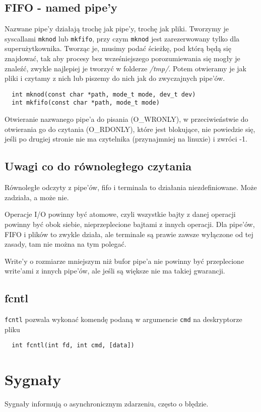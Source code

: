 \subsection{FIFO - named pipe'y}
Nazwane pipe'y działają trochę jak pipe'y, trochę jak pliki. Tworzymy je syscallami \texttt{mknod} lub \texttt{mkfifo}, przy czym \texttt{mknod} jest zarezerwowany tylko dla superużytkownika. Tworząc je, musimy podać ścieżkę, pod którą będą się znajdować, tak aby procesy bez wcześniejszego porozumiewania się mogły je znaleźć, zwykle najlepiej je tworzyć w folderze \textit{/tmp/}. Potem otwieramy je jak pliki i czytamy z nich lub piszemy do nich jak do zwyczajnych pipe'ów.
\begin{verbatim}
  int mknod(const char *path, mode_t mode, dev_t dev)
  int mkfifo(const char *path, mode_t mode)
\end{verbatim}
Otwieranie nazwanego pipe'a do pisania (O\_WRONLY), w przeciwieństwie do otwierania go do czytania (O\_RDONLY), które jest blokujące, nie powiedzie się, jeśli po drugiej stronie nie ma czytelnika (przynajmniej na linuxie) i zwróci -1.
\subsection{Uwagi co do równoległego czytania}
Równoległe odczyty z pipe'ów, fifo i terminala to działania niezdefiniowane. Może zadziała, a może nie.

Operacje I/O powinny być atomowe, czyli wszystkie bajty z danej operacji powinny być obok siebie, nieprzeplecione bajtami z innych operacji. Dla pipe'ów, FIFO i plików to zwykle działa, ale terminale są prawie zawsze wyłączone od tej zasady, tam nie można na tym polegać.

Write'y o rozmiarze mniejszym niż bufor pipe'a nie powinny być przeplecione write'ami z innych pipe'ów, ale jeśli są większe nie ma takiej gwarancji.
\subsection{fcntl}
\texttt{fcntl} pozwala wykonać komendę podaną w argumencie \texttt{cmd} na deskryptorze pliku
\begin{verbatim}
  int fcntl(int fd, int cmd, [data])
\end{verbatim}
\section{Sygnały}
Sygnały informują o asynchronicznym zdarzeniu, często o błędzie.
